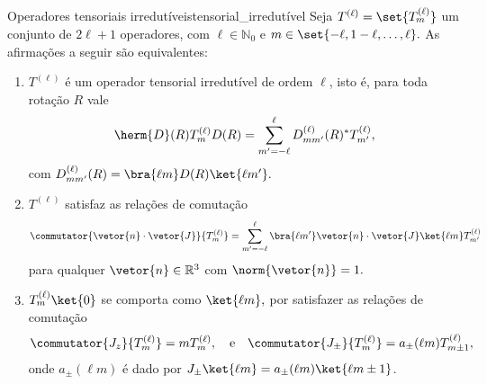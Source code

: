 \begin{theorem}{Operadores tensoriais irredutíveis}{tensorial_irredutível}
   Seja \(T^{(\ell)} = \set{T^{(\ell)}_{m}}\) um conjunto de \(2\ell + 1\) operadores, com \(\ell \in \mathbb{N}_0\) e \(m \in \set{-\ell, 1-\ell, \dots, \ell}.\) As afirmações a seguir são equivalentes:
   \begin{enumerate}[label=(\alph*)]
      \item \(T^{(\ell)}\) é um operador tensorial irredutível de ordem \(\ell\), isto é, para toda rotação \(R\) vale
         \begin{equation*}
            \herm{D}(R) T^{(\ell)}_m D(R) = \sum_{m' = -\ell}^{\ell}{D^{(\ell)}_{m m'}(R)^*T^{(\ell)}_{m'}},
         \end{equation*}
         com \(D^{(\ell)}_{m m'}(R) = \bra{\ell m}D(R)\ket{\ell m'}.\)
      \item \(T^{(\ell)}\) satisfaz as relações de comutação
         \begin{equation*}
            \commutator{\vetor{n}\cdot \vetor{J}}{T^{(\ell)}_{m}} = \sum_{m' = -\ell}^{\ell}{\bra{\ell m'}\vetor{n}\cdot\vetor{J}\ket{\ell m} T^{(\ell)}_{m'}}
         \end{equation*}
         para qualquer \(\vetor{n} \in \mathbb{R}^3\) com \(\norm{\vetor{n}} = 1.\)
      \item \(T^{(\ell)}_m\ket{0}\) se comporta como \(\ket{\ell m},\) por satisfazer as relações de comutação
         \begin{equation*}
            \commutator{J_z}{T^{(\ell)}_m} = m T^{(\ell)}_m,\quad\text{e}\quad\commutator{J_{\pm}}{T^{(\ell)}_m} = a_\pm(\ell m) T^{(\ell)}_{m\pm1},
         \end{equation*}
         onde \(a_\pm(\ell m)\) é dado por \(J_{\pm}\ket{\ell m} = a_\pm(\ell m)\ket{\ell {m \pm 1}}\).
   \end{enumerate}
\end{theorem}
